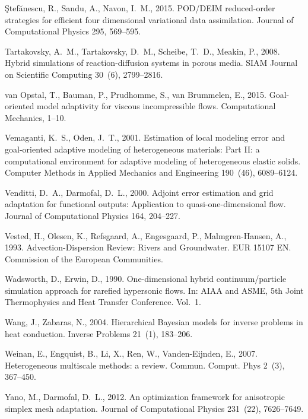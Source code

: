 \documentclass[review,sort&compress]{elsarticle}
\begin{document}
\begin{thebibliography}{42}
{\c{S}}tef{\u{a}}nescu, R., Sandu, A., Navon, I.~M., 2015. {POD}/{DEIM}
  reduced-order strategies for efficient four dimensional variational data
  assimilation. Journal of Computational Physics 295, 569--595.

Tartakovsky, A.~M., Tartakovsky, D.~M., Scheibe, T.~D., Meakin, P., 2008.
  Hybrid simulations of reaction-diffusion systems in porous media. SIAM
  Journal on Scientific Computing 30~(6), 2799--2816.

van Opstal, T., Bauman, P., Prudhomme, S., van Brummelen, E., 2015.
  Goal-oriented model adaptivity for viscous incompressible flows.
  Computational Mechanics, 1--10.

Vemaganti, K.~S., Oden, J.~T., 2001. Estimation of local modeling error and
  goal-oriented adaptive modeling of heterogeneous materials: {P}art {II}: a
  computational environment for adaptive modeling of heterogeneous elastic
  solids. Computer Methods in Applied Mechanics and Engineering 190~(46),
  6089--6124.

Venditti, D.~A., Darmofal, D.~L., 2000. Adjoint error estimation and grid
  adaptation for functional outputs: Application to quasi-one-dimensional flow.
  Journal of Computational Physics 164, 204--227.

Vested, H., Olesen, K., Refsgaard, A., Engesgaard, P., Malmgren-Hansen, A.,
  1993. Advection-Dispersion Review: Rivers and Groundwater. EUR 15107 EN.
  Commission of the European Communities.

Wadsworth, D., Erwin, D., 1990. One-dimensional hybrid continuum/particle
  simulation approach for rarefied hypersonic flows. In: AIAA and ASME, 5th
  Joint Thermophysics and Heat Transfer Conference. Vol.~1.

Wang, J., Zabaras, N., 2004. Hierarchical {B}ayesian models for inverse
  problems in heat conduction. Inverse Problems 21~(1), 183--206.

Weinan, E., Engquist, B., Li, X., Ren, W., Vanden-Eijnden, E., 2007.
  Heterogeneous multiscale methods: a review. Commun. Comput. Phys 2~(3),
  367--450.

Yano, M., Darmofal, D.~L., 2012. An optimization framework for anisotropic
  simplex mesh adaptation. Journal of Computational Physics 231~(22),
  7626--7649.

\end{thebibliography}
\end{document}
